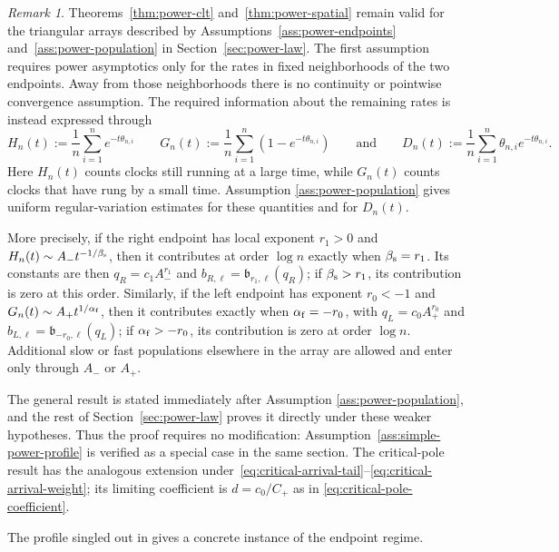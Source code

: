 \documentclass[11pt]{article}
\theoremstyle{remark}
\newtheorem{remark}[theorem]{Remark}
\theoremstyle{plain}
\begin{document}
\begin{remark}\label{rmk:power-population}
Theorems~\ref{thm:power-clt} and~\ref{thm:power-spatial} remain valid for the
triangular arrays described by Assumptions~\ref{ass:power-endpoints}
and~\ref{ass:power-population} in Section~\ref{sec:power-law}.  The first
assumption requires power asymptotics only for the rates in fixed
neighborhoods of the two endpoints.  Away from those neighborhoods there is
no continuity or pointwise convergence assumption.  The required information
about the remaining rates is instead expressed through
\[
 H_n(t):=\frac1n\sum_{i=1}^ne^{-t\theta_{n,i}}
 \qquad
 G_n(t):=\frac1n\sum_{i=1}^n(1-e^{-t\theta_{n,i}})
 \qquad\text{and}\qquad
 D_n(t):=\frac1n\sum_{i=1}^n\theta_{n,i}e^{-t\theta_{n,i}}.
\]
Here $H_n(t)$ counts clocks still running at a large time, while $G_n(t)$
counts clocks that have rung by a small time.  Assumption
\ref{ass:power-population} gives uniform regular-variation estimates for
these quantities and for $D_n(t)$.

More precisely, if the right endpoint has local exponent $r_1>0$ and
$H_n(t)\sim A_-t^{-1/\beta_{\rm s}}$, then it contributes at order $\log n$
exactly when $\beta_{\rm s}=r_1$.  Its constants are then
$q_R=c_1A_-^{r_1}$ and
$b_{R,\ell}=\mathfrak b_{r_1,\ell}(q_R)$; if
$\beta_{\rm s}>r_1$, its contribution is zero at this order.  Similarly, if
the left endpoint has exponent $r_0<-1$ and
$G_n(t)\sim A_+t^{1/\alpha_{\rm f}}$, then it contributes exactly when
$\alpha_{\rm f}=-r_0$, with
$q_L=c_0A_+^{r_0}$ and
$b_{L,\ell}=\mathfrak b_{-r_0,\ell}(q_L)$; if
$\alpha_{\rm f}>-r_0$, its contribution is zero at order $\log n$.
Additional slow or fast populations elsewhere in the array are allowed and
enter only through $A_-$ or $A_+$.

The general result is stated immediately after Assumption
\ref{ass:power-population}, and the rest of Section~\ref{sec:power-law}
proves it directly under these weaker hypotheses.  Thus the proof requires
no modification: Assumption~\ref{ass:simple-power-profile} is verified as a
special case in the same section.  The critical-pole result has the analogous
extension under~\eqref{eq:critical-arrival-tail}--\eqref{eq:critical-arrival-weight};
its limiting coefficient is $d=c_0/C_+$ as in
\eqref{eq:critical-pole-coefficient}.
\end{remark}

The profile singled out in
\cite[Section~5.2]{borga2025permutonlocallimitsluce} gives a concrete instance
of the endpoint regime.
\end{document}
